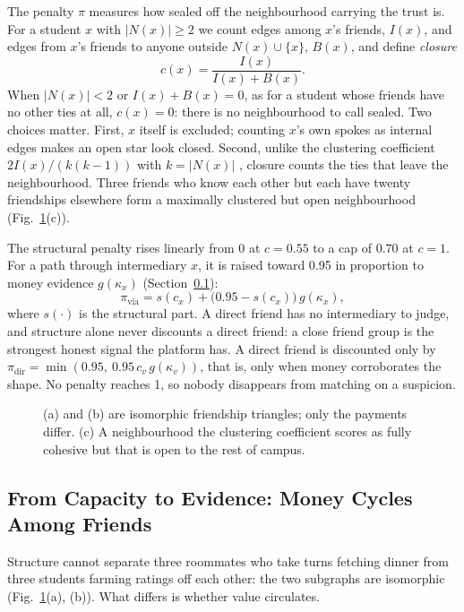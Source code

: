 \documentclass[journal]{IEEEtran}
\begin{document}
The penalty $\pi$ measures how sealed off the neighbourhood carrying the trust is.
For a student $x$ with $|N(x)|\ge2$ we count edges among $x$'s friends, $I(x)$, and
edges from $x$'s friends to anyone outside $N(x)\cup\{x\}$, $B(x)$, and define
\emph{closure}
\begin{equation}
c(x) = \frac{I(x)}{I(x)+B(x)}. \label{eq:closure}
\end{equation}
When $|N(x)|<2$ or $I(x)+B(x)=0$, as for a student whose friends have no other ties
at all, $c(x)=0$: there is no neighbourhood to call sealed. Two choices matter. First, $x$ itself is excluded; counting $x$'s own spokes as
internal edges makes an open star look closed. Second, unlike the clustering
coefficient $2I(x)/(k(k-1))$ with $k=|N(x)|$ \cite{watts1998collective}, closure
counts the ties that leave the neighbourhood. Three friends who know each other but
each have twenty friendships elsewhere form a maximally clustered but open
neighbourhood (Fig.~\ref{fig:shapes}(c)).

The structural penalty rises linearly from 0 at $c=0.55$ to a cap of 0.70 at $c=1$.
For a path through intermediary $x$, it is raised toward 0.95 in proportion to money
evidence $g(\kappa_x)$ (Section~\ref{sec:design-rings}):
\begin{equation}
\pi_{\text{via}} = s(c_x) + \bigl(0.95 - s(c_x)\bigr)\,g(\kappa_x), \label{eq:penalty}
\end{equation}
where $s(\cdot)$ is the structural part. A direct friend has no intermediary to judge,
and structure alone never discounts a direct friend: a close friend group is the
strongest honest signal the platform has. A direct friend is discounted only by
$\pi_{\text{dir}} = \min(0.95,\ 0.95\,c_v\,g(\kappa_v))$, that is, only when money
corroborates the shape. No penalty reaches 1, so nobody disappears from matching on a
suspicion.

\begin{figure}[!t]
\centering

\caption{(a) and (b) are isomorphic friendship triangles; only the payments differ.
(c) A neighbourhood the clustering coefficient scores as fully cohesive but that is
open to the rest of campus.}
\label{fig:shapes}
\end{figure}

\subsection{From Capacity to Evidence: Money Cycles Among Friends}\label{sec:design-rings}
Structure cannot separate three roommates who take turns fetching dinner from three
students farming ratings off each other: the two subgraphs are isomorphic
(Fig.~\ref{fig:shapes}(a), (b)). What differs is whether value circulates.
\end{document}
